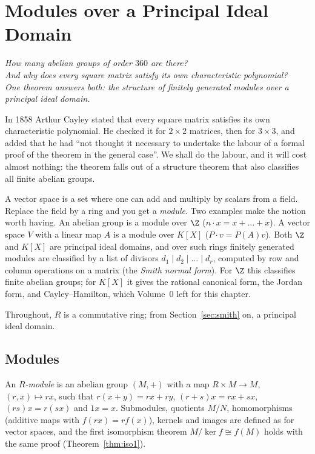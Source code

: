 \chapter{Modules over a Principal Ideal Domain}

\begin{center}\itshape
How many abelian groups of order $360$ are there?\\
And why does every square matrix satisfy its own characteristic polynomial?\\
One theorem answers both: the structure of finitely generated modules over a principal ideal domain.
\end{center}

In 1858 Arthur Cayley stated that every square matrix satisfies its own characteristic polynomial. He checked it for $2\times2$ matrices, then for
$3\times3$, and added that he had ``not thought it necessary to undertake the labour of a formal proof of the theorem in the general case''. We shall
do the labour, and it will cost almost nothing: the theorem falls out of a structure theorem that also classifies all finite abelian groups.

A vector space is a set where one can add and multiply by scalars from a field. Replace the field by a ring and you get a \emph{module}. Two examples make the notion worth having. An abelian group is a module over $\Z$ ($n\cdot x=x+\dots+x$). A vector space $V$ with a linear map $A$ is a module over $K[X]$ ($P\cdot v=P(A)v$). Both $\Z$ and $K[X]$ are principal ideal domains, and over such rings finitely generated modules are classified by a list of divisors $d_1\mid d_2\mid\dots\mid d_r$, computed by row and column operations on a matrix (the \emph{Smith normal form}). For $\Z$ this classifies finite abelian groups; for $K[X]$ it gives the rational canonical form, the Jordan form, and Cayley--Hamilton, which Volume~0 left for this chapter.

Throughout, $R$ is a commutative ring; from Section~\ref{sec:smith} on, a principal ideal domain.

\section{Modules}

\begin{definition}
An \emph{$R$-module} is an abelian group $(M,+)$ with a map $R\times M\to M$, $(r,x)\mapsto rx$, such that $r(x+y)=rx+ry$, $(r+s)x=rx+sx$, $(rs)x=r(sx)$ and $1x=x$. Submodules, quotients $M/N$, homomorphisms (additive maps with $f(rx)=rf(x)$), kernels and images are defined as for vector spaces, and the first isomorphism theorem $M/\ker f\cong f(M)$ holds with the same proof (Theorem~\ref{thm:iso1}).
\end{definition}

